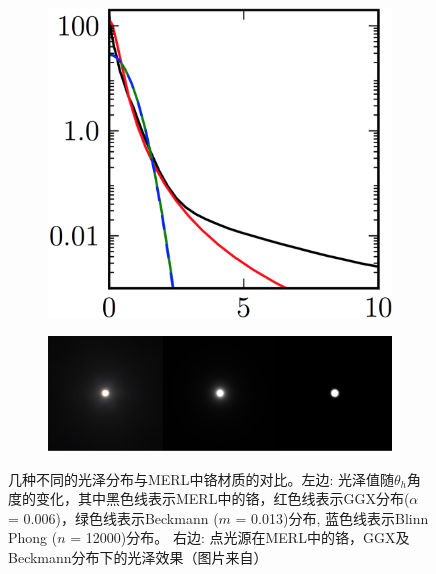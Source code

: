 \begin{figure}
\begin{fullwidth}
	\begin{subfigure}[b]{0.27\thewidth}
		\includegraphics[width=1.\textwidth]{graphics/gi/ray-optics-13-1}
	\end{subfigure}
	\begin{subfigure}[b]{0.72\thewidth}
		\includegraphics[width=1.\textwidth]{graphics/gi/ray-optics-13-2}
	\end{subfigure}
\caption{几种不同的光泽分布与MERL中铬材质的对比。左边: 光泽值随$\theta_h$角度的变化，其中黑色线表示MERL中的铬，红色线表示GGX分布($\alpha$ = 0.006)，绿色线表示Beckmann ($m$ = 0.013)分布, 蓝色线表示Blinn Phong ($n$ = 12000)分布。 右边: 点光源在MERL中的铬，GGX及Beckmann分布下的光泽效果（图片来自\cite{a:PhysicallyBasedShadingatDisney}）}
\label{f:intro-specular-lob-tails}
\end{fullwidth}
\end{figure}



